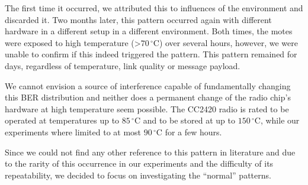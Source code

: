 The first time it occurred, we attributed this to influences of the environment and discarded it.
Two months later, this pattern occurred again with different hardware in a different setup in a different environment.
Both times, the motes were exposed to high temperature (>$70\,^{\circ}\mathrm{C}$) over several hours, however, we were unable to confirm if this indeed triggered the pattern.
This pattern remained for days, regardless of temperature, link quality or message payload.

We cannot envision a source of interference capable of fundamentally changing this \ac{BER} distribution and neither does a permanent change of the radio chip's hardware at high temperature seem possible.
The CC2420 radio is rated to be operated at temperatures up to $85\,^{\circ}\mathrm{C}$ and to be stored at up to $150\,^{\circ}\mathrm{C}$, while our experiments where limited to at most $90\,^{\circ}\mathrm{C}$ for a few hours.

Since we could not find any other reference to this pattern in literature and due to the rarity of this occurrence in our experiments and the difficulty of its repeatability, we decided to focus on investigating the ``normal'' patterns.










































